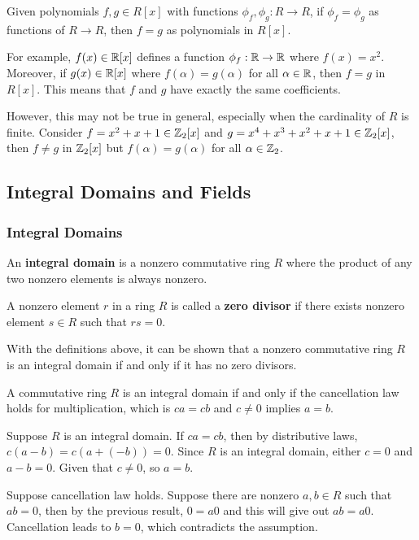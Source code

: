 \documentclass[a4paper,12pt]{article}
\begin{document}
\begin{pst}
  Given polynomials $f,g\in R[x]$ with functions $\phi_{f},\phi_{g}:R\to R$, if $\phi_{f}=\phi_{g}$ as functions of $R\to R$, then $f=g$ as polynomials in $R[x]$.
\end{pst}

For example, $f(x)\in \mathbb{R}[x]$ defines a function $\phi_{f}:\mathbb{R}\to\mathbb{R}$ where $f(x)=x^{2}$. Moreover, if $g(x)\in \mathbb{R}[x]$ where $f(\alpha)=g(\alpha)$ for all $\alpha\in\mathbb{R}$, then $f=g$ in $R[x]$. This means that $f$ and $g$ have exactly the same coefficients.\n

However, this may not be true in general, especially when the cardinality of $R$ is finite. Consider $f=x^{2}+x+1\in\mathbb{Z}_{2}[x]$ and $g=x^{4}+x^{3}+x^{2}+x+1\in\mathbb{Z}_{2}[x]$, then $f\neq g$ in $\mathbb{Z}_{2}[x]$ but $f(\alpha)=g(\alpha)$ for all $\alpha\in\mathbb{Z}_{2}$.

\subsection{Integral Domains and Fields}
\subsubsection{Integral Domains}
\begin{dft}
  An \textbf{integral domain} is a nonzero commutative ring $R$ where the product of any two nonzero elements is always nonzero.
\end{dft}\n

\begin{dft}
  A nonzero element $r$ in a ring $R$ is called a \textbf{zero divisor} if there exists nonzero element $s\in R$ such that $rs=0$.
\end{dft}\n

With the definitions above, it can be shown that a nonzero commutative ring $R$ is an integral domain if and only if it has no zero divisors.\n

\begin{pst}
  A commutative ring $R$ is an integral domain if and only if the cancellation law holds for multiplication, which is $ca=cb$ and $c\neq 0$ implies $a=b$.\n

  \prf\arr Suppose $R$ is an integral domain. If $ca=cb$, then by distributive laws, $c(a-b)=c(a+(-b))=0$. Since $R$ is an integral domain, either $c=0$ and $a-b=0$. Given that $c\neq 0$, so $a=b$.\n

  \arl Suppose cancellation law holds. Suppose there are nonzero $a,b\in R$ such that $ab=0$, then by the previous result, $0=a0$ and this will give out $ab=a0$. Cancellation leads to $b=0$, which contradicts the assumption.
\end{pst}
\end{document}
